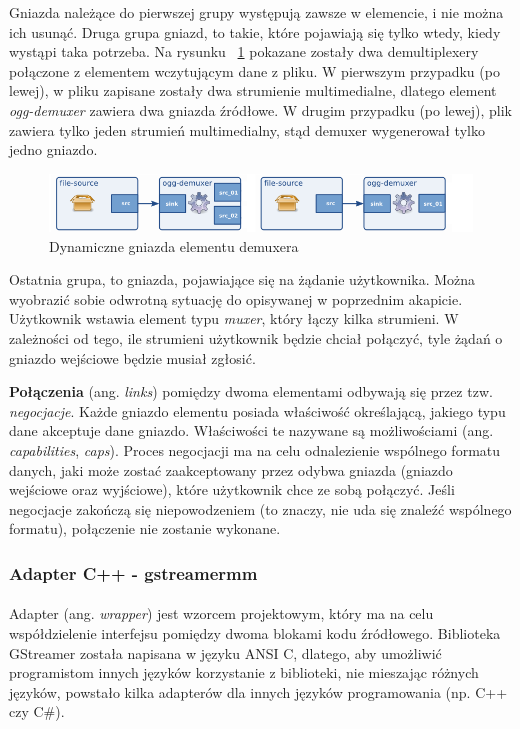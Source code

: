 \documentclass[12pt]{article}
\begin{document}
Gniazda należące do pierwszej grupy występują zawsze w elemencie, i nie można ich usunąć.
Druga grupa gniazd, to takie, które pojawiają się tylko wtedy, kiedy wystąpi taka potrzeba. Na rysunku ~\ref{fig:requestPadsDemux} pokazane zostały dwa demultiplexery połączone z elementem wczytującym dane z pliku. W pierwszym przypadku (po lewej), w pliku zapisane zostały dwa strumienie multimedialne, dlatego element \textit{ogg-demuxer} zawiera dwa gniazda źródłowe. W drugim przypadku (po lewej), plik zawiera tylko jeden strumień multimedialny, stąd demuxer wygenerował tylko jedno gniazdo.
\begin{figure}[H]
  \includegraphics[width=150mm]{img/request-pads-demux.png}
  \caption{Dynamiczne gniazda elementu demuxera \cite{gstmainpage}}
  \label{fig:requestPadsDemux}
\end{figure}
Ostatnia grupa, to gniazda, pojawiające się na żądanie użytkownika. Można wyobrazić sobie odwrotną sytuację do opisywanej w poprzednim akapicie. Użytkownik wstawia element typu \textit{muxer}, który łączy kilka strumieni. W zależności od tego, ile strumieni użytkownik będzie chciał połączyć, tyle żądań o gniazdo wejściowe będzie musiał zgłosić.

\textbf{Połączenia} (ang. \textit{links}) pomiędzy dwoma elementami odbywają się przez tzw. \textit{negocjacje}. Każde gniazdo elementu posiada właściwość określającą, jakiego typu dane akceptuje dane gniazdo. Właściwości te nazywane są możliwościami (ang. \textit{capabilities}, \textit{caps}). Proces negocjacji ma na celu odnalezienie wspólnego formatu danych, jaki może zostać zaakceptowany przez odybwa gniazda (gniazdo wejściowe oraz wyjściowe), które użytkownik chce ze sobą połączyć. Jeśli negocjacje zakończą się niepowodzeniem (to znaczy, nie uda się znaleźć wspólnego formatu), połączenie nie zostanie wykonane.

\subsubsection{Adapter C++ - gstreamermm}
\paragraph{}
Adapter (ang. \textit{wrapper}) jest wzorcem projektowym, który ma na celu współdzielenie interfejsu pomiędzy dwoma blokami kodu źródłowego. Biblioteka GStreamer została napisana w języku ANSI C, dlatego, aby umożliwić programistom innych języków korzystanie z biblioteki, nie mieszając różnych języków, powstało kilka adapterów dla innych języków programowania (np. C++ czy C\#).
\end{document}
